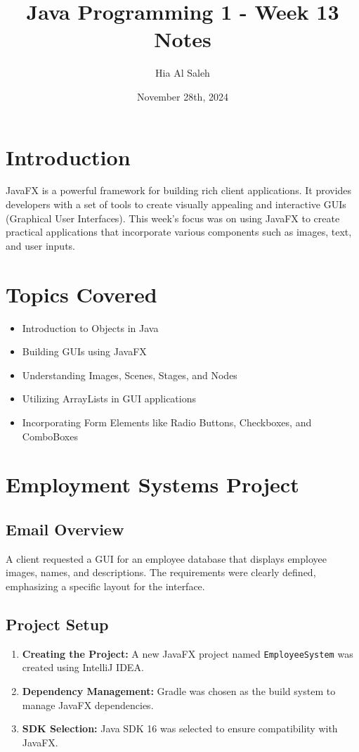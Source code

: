 \documentclass{article}
\title{Java Programming 1 - Week 13 Notes}
\author{Hia Al Saleh}
\date{November 28th, 2024}
\begin{document}
\maketitle
\tableofcontents
\newpage

\section{Introduction}
JavaFX is a powerful framework for building rich client applications. It provides developers with a set of tools to create visually appealing and interactive GUIs (Graphical User Interfaces). This week's focus was on using JavaFX to create practical applications that incorporate various components such as images, text, and user inputs.

\section{Topics Covered}
\begin{itemize}
    \item Introduction to Objects in Java
    \item Building GUIs using JavaFX
    \item Understanding Images, Scenes, Stages, and Nodes
    \item Utilizing ArrayLists in GUI applications
    \item Incorporating Form Elements like Radio Buttons, Checkboxes, and ComboBoxes
\end{itemize}

\section{Employment Systems Project}
\subsection{Email Overview}
A client requested a GUI for an employee database that displays employee images, names, and descriptions. The requirements were clearly defined, emphasizing a specific layout for the interface.

\subsection{Project Setup}
\begin{enumerate}
    \item \textbf{Creating the Project:} A new JavaFX project named \texttt{EmployeeSystem} was created using IntelliJ IDEA.
    \item \textbf{Dependency Management:} Gradle was chosen as the build system to manage JavaFX dependencies.
    \item \textbf{SDK Selection:} Java SDK 16 was selected to ensure compatibility with JavaFX.
\end{enumerate}
\end{document}
